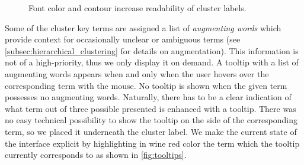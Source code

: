 \begin{figure}
    \centering
    \caption{Font color and contour increase readability of cluster labels.}
    \label{fig:cluster_labels}
\end{figure}

Some of the cluster key terms are assigned a list of \textit{augmenting words} which provide context for occasionally unclear or ambiguous terms (see \autoref{subsec:hierarchical_clustering} for details on augmentation).
This information is not of a high-priority, thus we only display it on demand.
A tooltip with a list of augmenting words appears when and only when the user hovers over the corresponding term with the mouse.
No tooltip is shown when the given term possesses no augmenting words.
Naturally, there has to be a clear indication of what term out of three possible presented is enhanced with a tooltip.
There was no easy technical possibility to show the tooltip on the side of the corresponding term, so we placed it underneath the cluster label.
We make the current state of the interface explicit by highlighting in wine red color the term which the tooltip currently corresponds to as shown in \autoref{fig:tooltips}.

